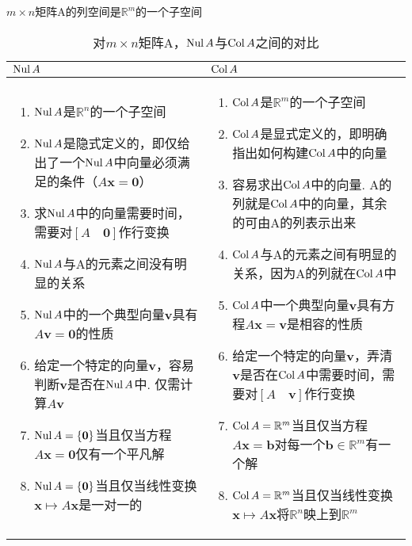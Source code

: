 \begin{theorem}
$m\times n$矩阵A的列空间是$\mathbb{R}^m$的一个子空间
\end{theorem}\vspace{4ex}

{\par\raggedright
{}
\par}\vspace{4ex}

\begin{table}[H]
\caption{对$m\times n$矩阵A，$\operatorname{Nul} A$与$\operatorname{Col} A$之间的对比}
\begin{tabular}{>{\scriptsize}p{6cm}|>{\scriptsize}p{6cm}}
\hline
$\operatorname{Nul} A$ & $\operatorname{Col} A$\\
\hline
\begin{enumerate}
\item $\operatorname{Nul} A$是$\mathbb{R}^n$的一个子空间
\item $\operatorname{Nul} A$是隐式定义的，即仅给出了一个$\operatorname{Nul} A$中向量必须满足的条件（$A\mathbf{x=0}$）
\item 求$\operatorname{Nul} A$中的向量需要时间，需要对$[A\quad\mathbf{0}]$作行变换
\item $\operatorname{Nul} A$与A的元素之间没有明显的关系
\item $\operatorname{Nul} A$中的一个典型向量$\mathbf{v}$具有$A\mathbf{v=0}$的性质
\item 给定一个特定的向量$\mathbf{v}$，容易判断$\mathbf{v}$是否在$\operatorname{Nul} A$中. 仅需计算$A\mathbf{v}$
\item $\operatorname{Nul} A=\{\mathbf{0}\}$当且仅当方程$A\mathbf{x=0}$仅有一个平凡解
\item $\operatorname{Nul} A=\{\mathbf{0}\}$当且仅当线性变换$\mathbf{x}\mapsto A\mathbf{x}$是一对一的
\end{enumerate} & \begin{enumerate}
\item $\operatorname{Col} A$是$\mathbb{R}^m$的一个子空间
\item $\operatorname{Col} A$是显式定义的，即明确指出如何构建$\operatorname{Col} A$中的向量
\item 容易求出$\operatorname{Col} A$中的向量. A的列就是$\operatorname{Col} A$中的向量，其余的可由A的列表示出来
\item $\operatorname{Col} A$与A的元素之间有明显的关系，因为A的列就在$\operatorname{Col} A$中
\item $\operatorname{Col} A$中一个典型向量$\mathbf{v}$具有方程$A\mathbf{x=v}$是相容的性质
\item 给定一个特定的向量$\mathbf{v}$，弄清$\mathbf{v}$是否在$\operatorname{Col} A$中需要时间，需要对$[A\quad\mathbf{v}]$作行变换
\item $\operatorname{Col} A=\mathbb{R}^m$当且仅当方程$A\mathbf{x=b}$对每一个$\mathbf{b}\in\mathbb{R}^m$有一个解
\item $\operatorname{Col} A=\mathbb{R}^m$当且仅当线性变换$\mathbf{x}\mapsto A\mathbf{x}$将$\mathbb{R}^n$映上到$\mathbb{R}^m$
\end{enumerate}\\
\hline
\end{tabular}
\end{table}
